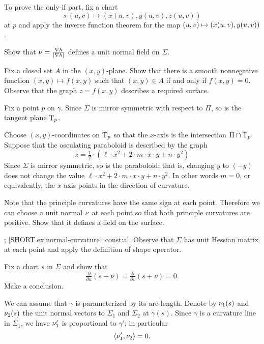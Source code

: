 To prove the only-if part, fix a chart 
\[s\:(u,v)\mapsto(x(u,v),y(u,v),z(u,v))\] at $p$ and apply the inverse function theorem for the map $(u,v)\z\mapsto(x(u,v),y(u,v))$.


 Show that $\nu=\tfrac{\nabla h}{|\nabla h|}$ defines a unit normal field on $\Sigma$.

Fix a closed set $A$ in the $(x,y)$-plane.
Show that there is a smooth nonnegative function $(x,y)\mapsto f(x,y)$ such that $(x,y)\in A$ if and only if $f(x,y)=0$.
Observe that the graph $z=f(x,y)$ describes a required surface.

Fix a point $p$ on $\gamma$.
Since $\Sigma$ is mirror symmetric with respect to $\Pi$,
so is the tangent plane $\mathrm{T}_p$.

Choose $(x,y)$-coordinates on $\mathrm{T}_p$ so that the $x$-axis is the intersection $\Pi\cap  \mathrm{T}_p$.
Suppose that the osculating paraboloid is described by the graph 
\[z=\tfrac12\cdot(\ell\cdot x^2+2\cdot m\cdot x\cdot y+n\cdot y^2)\]
Since $\Sigma$ is mirror symmetric, so is the paraboloid;
that is, changing $y$ to $(-y)$ does not change the value 
$\ell\cdot x^2+2\cdot m\cdot x\cdot y+n\cdot y^2$.
In other words $m=0$, or equivalently, the $x$-axis points in the direction of curvature.

 Note that the principle curvatures have the same sign at each point.
Therefore we can choose a unit normal $\nu$ at each point so that both principle curvatures are positive.
Show that it defines a field on the surface.


\parbf{\ref{ex:normal-curvature=const}}; \ref{SHORT.ex:normal-curvature=const:a}.
Observe that $\Sigma$ has unit Hessian matrix at each point and apply the definition of shape operator.

 Fix a chart $s$ in $\Sigma$ and show that 
\[\tfrac{\partial }{\partial u}(s+\nu)
=
\tfrac{\partial }{\partial v}(s+\nu)
=
0.\]
Make a conclusion.

We can assume that $\gamma$ is parameterized by its arc-length.
Denote by $\nu_1(s)$ and $\nu_2(s)$ the unit normal vectors to $\Sigma_1$ and $\Sigma_2$ at $\gamma(s)$.
Since $\gamma$ is a curvature line in $\Sigma_1$, we have 
$\nu_1'$ is proportional to $\gamma'$;
in particular 
\[\langle\nu_1',\nu_2\rangle=0.\]

